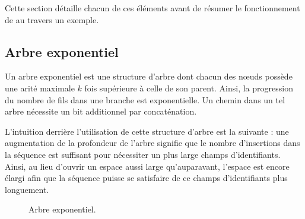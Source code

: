 
Cette section détaille chacun de ces éléments avant de résumer le fonctionnement
de \LSEQ au travers un exemple.







\subsection{Arbre exponentiel}
\label{repl:subsec:exponentialtree}

Un arbre exponentiel est une structure d'arbre dont chacun des nœuds possède une
arité maximale $k$ fois supérieure à celle de son parent. Ainsi, la progression
du nombre de fils dans une branche est exponentielle. Un chemin dans un tel
arbre nécessite un bit additionnel par concaténation.

L'intuition derrière l'utilisation de cette structure d'arbre est la suivante :
une augmentation de la profondeur de l'arbre signifie que le nombre d'insertions
dans la séquence est suffisant pour nécessiter un plus large champs
d'identifiants. Ainsi, au lieu d'ouvrir un espace aussi large qu'auparavant,
l'espace est encore élargi afin que la séquence puisse se satisfaire de ce champs
d'identifiants plus longuement.

\begin{figure}
  \begin{center}
    
    \caption[Arbre exponentiel]
    {\label{repl:fig:exponentialtree}Arbre exponentiel.}
  \end{center}
\end{figure}

